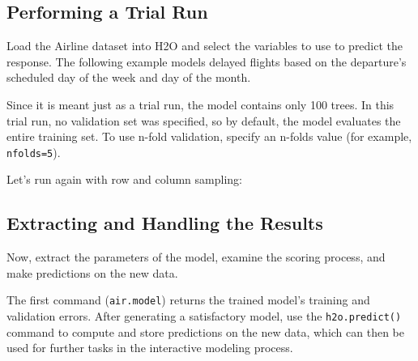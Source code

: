 \waterExampleInPython



\subsection{Performing a Trial Run}
Load the Airline dataset into H2O and select the variables to use to predict  the response. The following example models delayed flights based on the departure's scheduled day of the week and day of the month.

\waterExampleInR



\waterExampleInPython



Since it is meant just as a trial run, the model contains only 100 trees. In this trial run, no validation set was
specified, so by default, the model evaluates the entire training set.  To use n-fold validation, specify an n-folds value (for example, \texttt{nfolds=5}).

Let's run again with row and column sampling:

\waterExampleInR



\waterExampleInPython


\newpage
\subsection{Extracting and Handling the Results}

Now, extract the parameters of the model, examine the scoring process, and make predictions on the new data.

\begin{minipage}{\textwidth}

\waterExampleInR

\end{minipage}

\begin{minipage}{\textwidth}
\waterExampleInPython

\end{minipage}

The first command ({\texttt{air.model}}) returns the trained model's training and validation errors.
After generating a satisfactory model, use the \texttt{h2o.predict()} command to compute and store predictions on the
new data, which can then be used for further tasks in the interactive modeling process.

